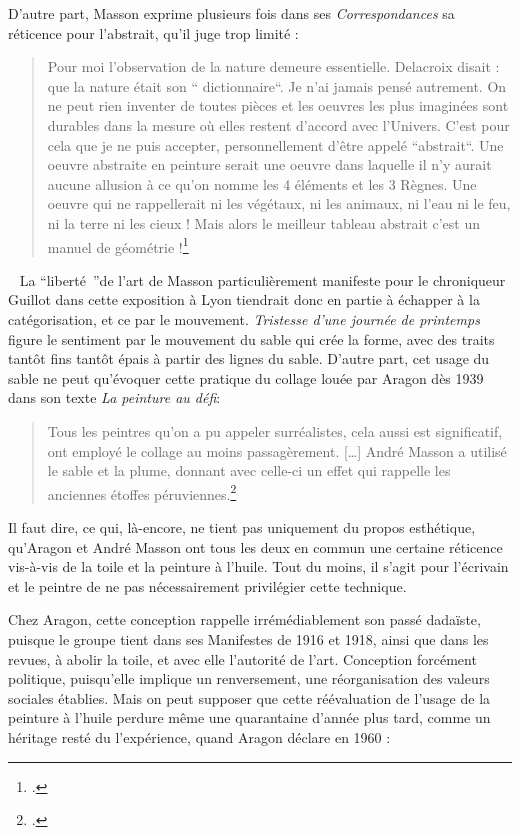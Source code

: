 D’autre part, Masson exprime plusieurs fois dans ses \emph{Correspondances} sa réticence pour l’abstrait, qu’il juge trop limité : 

\begin{quote}
Pour moi l’observation de la nature demeure essentielle. Delacroix disait : que la nature était son “ dictionnaire“. Je n’ai jamais pensé autrement. On ne peut rien inventer de toutes pièces et les oeuvres les plus imaginées sont durables dans la mesure où elles restent d’accord avec l’Univers. C’est pour cela que je ne puis accepter, personnellement d’être appelé “abstrait“. Une oeuvre abstraite en peinture serait une oeuvre dans laquelle il n’y aurait aucune allusion à ce qu’on nomme les 4 éléments et les 3 Règnes. Une oeuvre qui ne rappellerait ni les végétaux, ni les animaux, ni l’eau ni le feu, ni la terre ni les cieux ! Mais alors le meilleur tableau abstrait c’est un manuel de géométrie !\footcite[p464]{anneessurrealistes}\end{quote}
 
	La \enquote{liberté }de l’art de Masson particulièrement manifeste pour le chroniqueur Guillot dans cette exposition à Lyon tiendrait donc en partie à échapper à la catégorisation, et ce par le mouvement. \emph{Tristesse d’une journée de printemps} figure le sentiment par le mouvement du sable qui crée la forme, avec des traits tantôt fins tantôt épais à partir des lignes du sable. D’autre part, cet usage du sable ne peut qu’évoquer cette pratique du collage louée par Aragon dès 1939 dans son texte \emph{La peinture au défi}:
\begin{quote}
Tous les peintres qu’on a pu appeler surréalistes, cela aussi est significatif, ont employé le collage au moins passagèrement. […] André Masson a utilisé le sable et la plume, donnant avec celle-ci un effet qui rappelle les anciennes étoffes péruviennes.\footcite[p78]{ecritssurla}\end{quote}	


 	 Il faut dire, ce qui, là-encore, ne tient pas uniquement du propos esthétique, qu’Aragon et André Masson ont tous les deux en commun une certaine réticence vis-à-vis de la toile et la peinture à l’huile. Tout du moins, il s’agit pour l’écrivain et le peintre de ne pas nécessairement privilégier cette technique. 

	Chez Aragon, cette conception rappelle irrémédiablement son passé dadaïste, puisque le groupe tient dans ses Manifestes de 1916 et 1918, ainsi que dans les revues, à abolir la toile, et avec elle l’autorité de l’art. Conception forcément politique, puisqu’elle implique un renversement, une réorganisation des valeurs sociales établies. Mais on peut supposer que cette réévaluation de l’usage de la peinture à l’huile perdure même une quarantaine d’année plus tard, comme un héritage resté du l’expérience, quand Aragon déclare en 1960 : 

